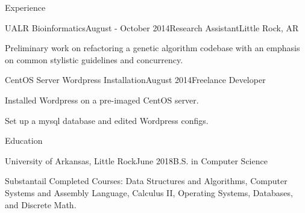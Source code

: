 \documentclass{resume} %
\begin{document}
\begin{rSection}{Experience}
\begin{rSubsection}{UALR Bioinformatics}{August - October 2014}{Research Assistant}{Little Rock, AR}

	\item Preliminary work on refactoring a genetic algorithm codebase with an emphasis on common stylistic guidelines and concurrency.
\end{rSubsection}

\begin{rSubsection}{CentOS Server Wordpress Installation}{August 2014}{Freelance Developer}{}

	\item Installed Wordpress on a pre-imaged CentOS server.
	\item Set up a mysql database and edited Wordpress configs.
\end{rSubsection}

%

%

\end{rSection}


\begin{rSection}{Education}

\begin{rSubsection}{University of Arkansas, Little Rock}{June 2018}{B.S. in Computer Science}

	\item Substantail Completed Courses: Data Structures and Algorithms, Computer Systems and Assembly Language, Calculus II, Operating Systems, Databases, and Discrete Math.
\end{rSubsection}

\end{rSection}
\end{document}
